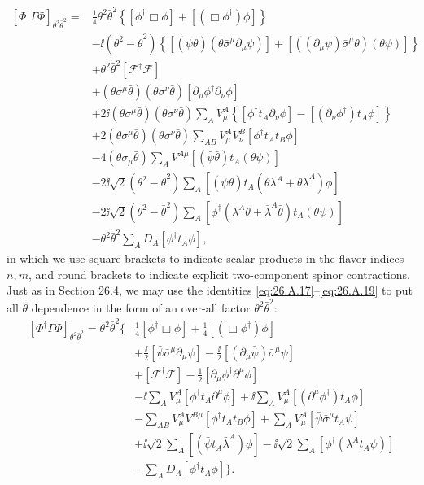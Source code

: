 \[
  \begin{aligned}
  \left[\Phi^\dagger\Gamma\Phi\right]_{\theta^2\bar\theta^2}
  ={}&\frac14\theta^2\bar\theta^2
  \left\{
    [\phi^\dagger\Box\phi]+[(\Box\phi^\dagger)\phi]
  \right\}
  \\
  &-\ii(\theta^2-\bar\theta^2)
  \left\{
    [(\bar\psi\bar\theta)
      (\bar\theta\bar\sigma^\mu\partial_\mu\psi)]
    +[((\partial_\mu\bar\psi)\bar\sigma^\mu\theta)
      (\theta\psi)]
  \right\}
  \\
  &+\theta^2\bar\theta^2[\mathcal{F}^\dagger\mathcal{F}]
  \\
  &+(\theta\sigma^\mu\bar\theta)(\theta\sigma^\nu\bar\theta)
    [\partial_\mu\phi^\dagger\partial_\nu\phi]
  \\
  &+2\ii(\theta\sigma^\mu\bar\theta)(\theta\sigma^\nu\bar\theta)
    \sum_A V^A_\mu
    \left\{
      [\phi^\dagger t_A\partial_\nu\phi]
      -[(\partial_\nu\phi^\dagger)t_A\phi]
    \right\}
  \\
  &+2(\theta\sigma^\mu\bar\theta)(\theta\sigma^\nu\bar\theta)
    \sum_{AB}V^A_\mu V^B_\nu[\phi^\dagger t_At_B\phi]
  \\
  &-4(\theta\sigma_\mu\bar\theta)
    \sum_A V^{A\mu}
    [(\bar\psi\bar\theta)t_A(\theta\psi)]
  \\
  &-2\ii\sqrt{2}(\theta^2-\bar\theta^2)
    \sum_A[(\bar\psi\bar\theta)t_A
      (\theta\lambda^A+\bar\theta\bar\lambda^A)\phi]
  \\
  &-2\ii\sqrt{2}(\theta^2-\bar\theta^2)
    \sum_A[\phi^\dagger
      (\lambda^A\theta+\bar\lambda^A\bar\theta)t_A(\theta\psi)]
  \\
  &-\theta^2\bar\theta^2
    \sum_A D_A[\phi^\dagger t_A\phi],
  \end{aligned}
\]
in which we use square brackets to indicate scalar products in the flavor
indices \(n,m\), and round brackets to indicate explicit two-component
spinor contractions. Just as in Section 26.4, we may use the
identities \eqref{eq:26.A.17}--\eqref{eq:26.A.19} to put all \(\theta\)
dependence in the form of an over-all factor \(\theta^2\bar\theta^2\):
\[
  \begin{aligned}
  \left[\Phi^\dagger\Gamma\Phi\right]_{\theta^2\bar\theta^2}
  =\theta^2\bar\theta^2\biggl\{&
  \frac14[\phi^\dagger\Box\phi]
  +\frac14[(\Box\phi^\dagger)\phi]
  \\
  &+\frac{\ii}{2}[\bar\psi\bar\sigma^\mu\partial_\mu\psi]
  -\frac{\ii}{2}[(\partial_\mu\bar\psi)\bar\sigma^\mu\psi]
  \\
  &+[\mathcal{F}^\dagger\mathcal{F}]
  -\frac12[\partial_\mu\phi^\dagger\partial^\mu\phi]
  \\
  &-\ii\sum_A V^A_\mu
    [\phi^\dagger t_A\partial^\mu\phi]
  +\ii\sum_A V^A_\mu
    [(\partial^\mu\phi^\dagger)t_A\phi]
  \\
  &-\sum_{AB}V^A_\mu V^{B\mu}
    [\phi^\dagger t_At_B\phi]
  +\sum_A V^A_\mu
    [\bar\psi\bar\sigma^\mu t_A\psi]
  \\
  &+\ii\sqrt{2}\sum_A[(\bar\psi t_A\bar\lambda^A)\phi]
  -\ii\sqrt{2}\sum_A[\phi^\dagger(\lambda^At_A\psi)]
  \\
  &-\sum_A D_A[\phi^\dagger t_A\phi]
  \biggr\}.
  \end{aligned}
\]
